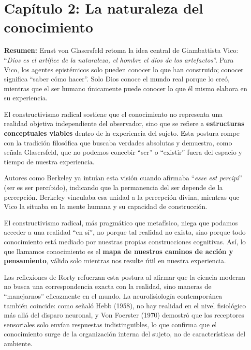 \documentclass{article}
\begin{document}
\section*{Capítulo 2: La naturaleza del conocimiento}

\textbf{Resumen:}  
Ernst von Glasersfeld retoma la idea central de Giambattista Vico: “\textit{Dios es el artífice de la naturaleza, el hombre el dios de los artefactos}”. Para Vico, los agentes epistémicos solo pueden conocer lo que han construido; conocer significa “saber cómo hacer”. Solo Dios conoce el mundo real porque lo creó, mientras que el ser humano únicamente puede conocer lo que él mismo elabora en su experiencia.

El constructivismo radical sostiene que el conocimiento no representa una realidad objetiva independiente del observador, sino que se refiere a \textbf{estructuras conceptuales viables} dentro de la experiencia del sujeto. Esta postura rompe con la tradición filosófica que buscaba verdades absolutas y demuestra, como señala Glasersfeld, que no podemos concebir “ser” o “existir” fuera del espacio y tiempo de nuestra experiencia.

Autores como Berkeley ya intuían esta visión cuando afirmaba “\textit{esse est percipi}” (ser es ser percibido), indicando que la permanencia del ser depende de la percepción. Berkeley vinculaba esa unidad a la percepción divina, mientras que Vico la situaba en la mente humana y su capacidad de construcción.

El constructivismo radical, más pragmático que metafísico, niega que podamos acceder a una realidad “en sí”, no porque tal realidad no exista, sino porque todo conocimiento está mediado por nuestras propias construcciones cognitivas. Así, lo que llamamos conocimiento es el \textbf{mapa de nuestros caminos de acción y pensamiento}, válido solo mientras nos resulte útil en nuestra experiencia.

Las reflexiones de Rorty refuerzan esta postura al afirmar que la ciencia moderna no busca una correspondencia exacta con la realidad, sino maneras de “manejarnos” eficazmente en el mundo. La neurofisiología contemporánea también coincide: como señaló Hebb (1958), no hay realidad en el nivel fisiológico más allá del disparo neuronal, y Von Foerster (1970) demostró que los receptores sensoriales solo envían respuestas indistinguibles, lo que confirma que el conocimiento surge de la organización interna del sujeto, no de características del ambiente.
\end{document}
